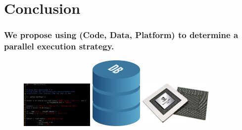 \documentclass{beamer}
\begin{document}
\section{Conclusion}
\begin{frame}

%
%
%

    \frametitle{We propose using (Code, Data, Platform) to determine a
    parallel execution strategy.}

\begin{figure}
            \includegraphics[width=1.4in]{code_screen.png}
            \hfill
            \includegraphics[width=1in]{database.png}
            \hfill
            \includegraphics[width=1.4in]{gpu.jpg}
\end{figure}

\end{frame}
\end{document}
